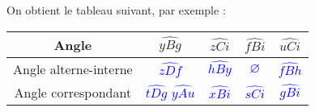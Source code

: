    On obtient le tableau suivant, par exemple : \\ \smallskip
   \begin{tabular}{|C{1.8}|*{4}{C{0.9}|}}
      \hline
      Angle & $\widehat{yBg}$ & $\widehat{zCi}$ & $\widehat{fBi}$ & $\widehat{uCi}$ \\
      \hline
       \footnotesize Angle alterne-interne & \textcolor{blue}{$\widehat{zDf}$} & \textcolor{blue}{$\widehat{hBy}$} & \textcolor{blue}{$\varnothing$} & \textcolor{blue}{$\widehat{fBh}$} \\
       \hline
       \footnotesize Angle correspondant & \textcolor{blue}{$\widehat{tDg}$} \textcolor{blue}{$\widehat{yAu}$} & \textcolor{blue}{$\widehat{xBi}$} & \textcolor{blue}{$\widehat{sCi}$} & \textcolor{blue}{$\widehat{gBi}$} \\
       \hline
   \end{tabular}
